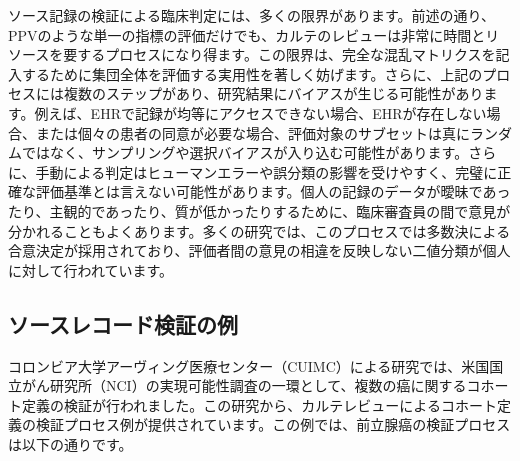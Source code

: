 \documentclass[
  11pt]{book}
\theoremstyle{definition}
\theoremstyle{definition}
\theoremstyle{definition}
\theoremstyle{definition}
\theoremstyle{remark}
\begin{document}
ソース記録の検証による臨床判定には、多くの限界があります。前述の通り、PPVのような単一の指標の評価だけでも、カルテのレビューは非常に時間とリソースを要するプロセスになり得ます。この限界は、完全な混乱マトリクスを記入するために集団全体を評価する実用性を著しく妨げます。さらに、上記のプロセスには複数のステップがあり、研究結果にバイアスが生じる可能性があります。例えば、EHRで記録が均等にアクセスできない場合、EHRが存在しない場合、または個々の患者の同意が必要な場合、評価対象のサブセットは真にランダムではなく、サンプリングや選択バイアスが入り込む可能性があります。さらに、手動による判定はヒューマンエラーや誤分類の影響を受けやすく、完璧に正確な評価基準とは言えない可能性があります。個人の記録のデータが曖昧であったり、主観的であったり、質が低かったりするために、臨床審査員の間で意見が分かれることもよくあります。多くの研究では、このプロセスでは多数決による合意決定が採用されており、評価者間の意見の相違を反映しない二値分類が個人に対して行われています。

\subsection{ソースレコード検証の例}\label{ux30bdux30fcux30b9ux30ecux30b3ux30fcux30c9ux691cux8a3cux306eux4f8b}

コロンビア大学アーヴィング医療センター（CUIMC）による研究では、米国国立がん研究所（NCI）の実現可能性調査の一環として、複数の癌に関するコホート定義の検証が行われました。この研究から、カルテレビューによるコホート定義の検証プロセス例が提供されています。この例では、前立腺癌の検証プロセスは以下の通りです。
\end{document}
